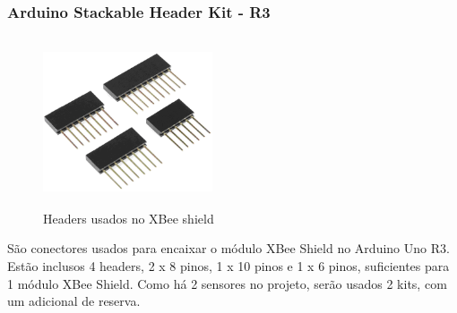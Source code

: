 \subsubsection{Arduino Stackable Header Kit - R3}
\begin{figure}[H]
\begin{center}
\includegraphics[width=5cm,height=5cm,keepaspectratio]{figuras/headers.png}
\caption{\label{fig:xbee shield headers} Headers usados no XBee shield}
\end{center}
\end{figure}

São conectores usados para encaixar o módulo XBee Shield no Arduino Uno R3. Estão inclusos 4 headers, 2 x 8 pinos, 1 x 10 pinos e 1 x 6 pinos, suficientes para 1 módulo XBee Shield. Como há 2 sensores no projeto, serão usados 2 kits, com um adicional de reserva.



